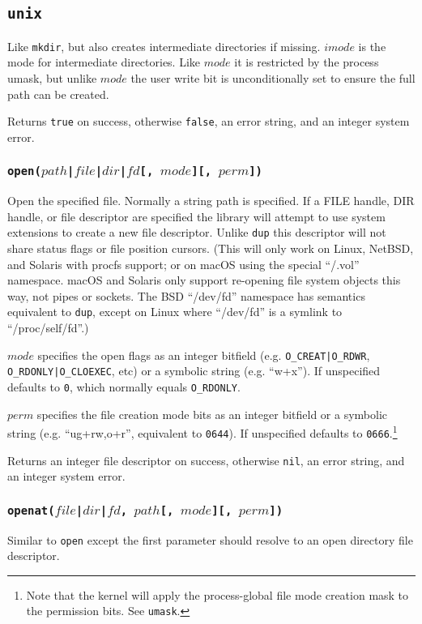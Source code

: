 \documentclass[11pt, oneside]{memoir}
\newcommand*{\true}[0]{\texttt{true}\xspace}
\newcommand*{\false}[0]{\texttt{false}\xspace}
\newcommand*{\nil}[0]{\texttt{nil}\xspace}
\newcommand*{\syscall}[1]{\texttt{#1}\xspace}
\newcommand*{\fn}[1]{\texttt{#1}\xspace}
\newcounter{toccols}
\newenvironment{Module}[1]{
	\subsection{\texttt{#1}}
	\addtocontents{toc}{
		\protect\begin{multicols}{\value{toccols}}
	}
}{
	\addtocontents{toc}{\protect\end{multicols}}
}
\begin{document}
\begin{Module}{unix}
Like \fn{mkdir}, but also creates intermediate directories if missing. $imode$ is the mode for intermediate directories. Like $mode$ it is restricted by the process umask, but unlike $mode$ the user write bit is unconditionally set to ensure the full path can be created.

Returns \true on success, otherwise \false, an error string, and an integer system error.

\subsubsection[\fn{open}]{\fn{open($path$|$file$|$dir$|$fd$[, $mode$][, $perm$])}}

Open the specified file. Normally a string path is specified. If a FILE handle, DIR handle, or file descriptor are specified the library will attempt to use system extensions to create a new file descriptor. Unlike \syscall{dup} this descriptor will not share status flags or file position cursors. (This will only work on Linux, NetBSD, and Solaris with procfs support; or on macOS using the special ``/.vol'' namespace. macOS and Solaris only support re-opening file system objects this way, not pipes or sockets. The BSD ``/dev/fd'' namespace has semantics equivalent to \syscall{dup}, except on Linux where ``/dev/fd'' is a symlink to ``/proc/self/fd''.)

$mode$ specifies the open flags as an integer bitfield (e.g. \texttt{O\_CREAT|O\_RDWR}, \texttt{O\_RDONLY|O\_CLOEXEC}, etc) or a symbolic string (e.g. ``w+x''). If unspecified defaults to \texttt{0}, which normally equals \texttt{O\_RDONLY}.

$perm$ specifies the file creation mode bits as an integer bitfield or a symbolic string (e.g. ``ug+rw,o+r'', equivalent to \texttt{0644}). If unspecified defaults to \texttt{0666}.\footnote{Note that the kernel will apply the process-global file mode creation mask to the permission bits. See \syscall{umask}.}

Returns an integer file descriptor on success, otherwise \nil, an error string, and an integer system error.

\subsubsection[\fn{openat}]{\fn{openat($file$|$dir$|$fd$, $path$[, $mode$][, $perm$])}}

Similar to \syscall{open} except the first parameter should resolve to an open directory file descriptor.


\end{Module}
\end{document}
